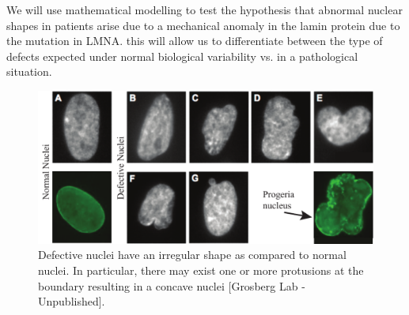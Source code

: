 We will use mathematical modelling to test the hypothesis that abnormal nuclear shapes in patients arise due to a mechanical anomaly in the lamin protein due to the mutation in LMNA. this will allow us to differentiate between the type of defects expected under normal biological variability vs. in a pathological situation. 

\begin{figure}[h]
\centering
\captionsetup{width=.9\linewidth}
\includegraphics[width=6in]{Project3/figs/blebnuclei}
\caption{Defective nuclei have an irregular shape as compared to normal nuclei. In particular, there may exist one or more protusions at the boundary resulting in a concave nuclei [Grosberg Lab - Unpublished].}
\label{fig::blebnuclei}
\end{figure}
